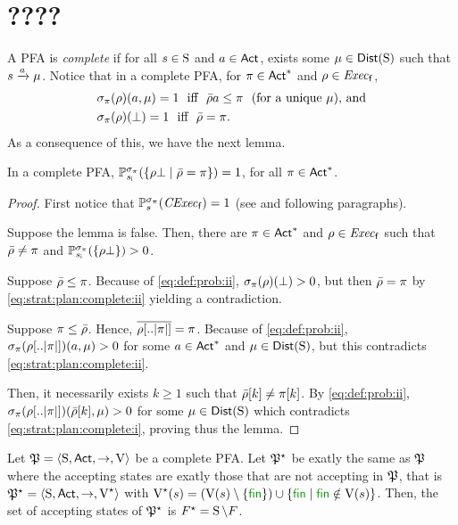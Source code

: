 
\section{????}


A PFA is \emph{complete} if for all $s\in\S$ and $a\in\Act$, exists
some $\mu\in\Dist(\S)$ such that $s\reach{a}\mu$.
%
Notice that in a complete PFA, for $\plan\in\Act^*$ and
$\rho\in\execf$,
\begin{align}
  &\strat_\plan(\rho)(a,\mu)=1 \text{ \ iff \ } \bar{\rho}a\leq\plan \text{ \ (for a unique } \mu \text{), and} \label{eq:strat:plan:complete:i}\\
  &\strat_\plan(\rho)(\complete)=1 \text{ \ iff \ } \bar{\rho}=\plan. \label{eq:strat:plan:complete:ii}
\end{align}
%
As a consequence of this, we have the next lemma.

\begin{lemma}\label{lm:strat:plan:complete}
  In a complete PFA,
  $\Prob_{\sini}^{\strat_\plan}(\{{\rho\complete}\mid{\bar{\rho}=\plan}\})=1$,
  for all $\plan\in\Act^*$.
\end{lemma}
%
\begin{proof}
  First notice that $\Prob^{\strat_\plan}_s(\cexecf)=1$ (see
   and following paragraphs).
  
  Suppose the lemma is false.  Then, there are $\plan\in\Act^*$ and
  $\rho\in\execf$ such that $\bar{\rho}\neq\plan$ and
  $\Prob_{\sini}^{\strat_\plan}(\{\rho\complete\})>0$.

  Suppose $\bar{\rho}\leq\plan$. Because of \cref{eq:def:prob:ii},
  $\strat_\plan(\rho)(\complete)> 0$, but then $\bar{\rho}=\plan$
  by \cref{eq:strat:plan:complete:ii} yielding a contradiction.

  Suppose $\plan\leq\bar{\rho}$. Hence,
  $\overline{\rho[..\size{\plan}]}=\plan$.  Because of
  \cref{eq:def:prob:ii}, $\strat_\plan(\rho[..\size{\plan}])(a,\mu)>0$
  for some $a\in\Act^*$ and $\mu\in\Dist(\S)$, but this contradicts
  \cref{eq:strat:plan:complete:ii}.

  Then, it necessarily exists $k\geq1$ such that
  $\bar{\rho}[k]\neq\plan[k]$.  By \cref{eq:def:prob:ii},
  $\strat_\plan(\rho[..\size{\plan}])(\bar{\rho}[k],\mu)>0$ for some
  $\mu\in\Dist(\S)$ which contradicts \cref{eq:strat:plan:complete:i},
  proving thus the lemma.
\end{proof}

Let $\pfa=\tup{\S,\Act,\ra,\V}$ be a complete PFA.  Let $\pfa^\star$
be exatly the same as $\pfa$ where the accepting states are exatly
those that are not accepting in $\pfa$, that is
$\pfa^\star=\tup{\S,\Act,\ra,\V^\star}$ with
$\V^\star(s)=(\V(s)\setminus\{\fin\})\cup\{\fin\mid{\fin\notin\V(s)}\}$.
%
Then, the set of accepting states of $\pfa^\star$ is
$F^\star=\S\setminus F$.

